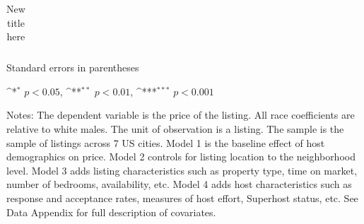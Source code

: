 \begin{table}[htbp]\centering
	\def\sym#1{\ifmmode^{#1}\else\(^{#1}\)\fi}
	\caption{New title here}
	\label{table:price_new}
	\begin{tabular}{c|ccccc}
		\toprule
		
		
		
		\bottomrule
	\end{tabular}
	
	\begin{tablenotes}
		\item \footnotesize Standard errors in parentheses
		\item \footnotesize \sym{*} \(p<0.05\), \sym{**} \(p<0.01\), \sym{***} \(p<0.001\)
		
		\item Notes: The dependent variable is the price of the listing. All race coefficients are relative to white males. The unit of observation is a listing. The sample is the sample of listings across 7 US cities. Model 1 is the baseline effect of host demographics on price. Model 2 controls for listing location to the neighborhood level. Model 3 adds listing characteristics such as property type, time on market, number of bedrooms, availability, etc. Model 4 adds host characteristics such as response and acceptance rates, measures of host effort, Superhost status, etc. See Data Appendix for full description of covariates.  
	\end{tablenotes}
\end{table}





